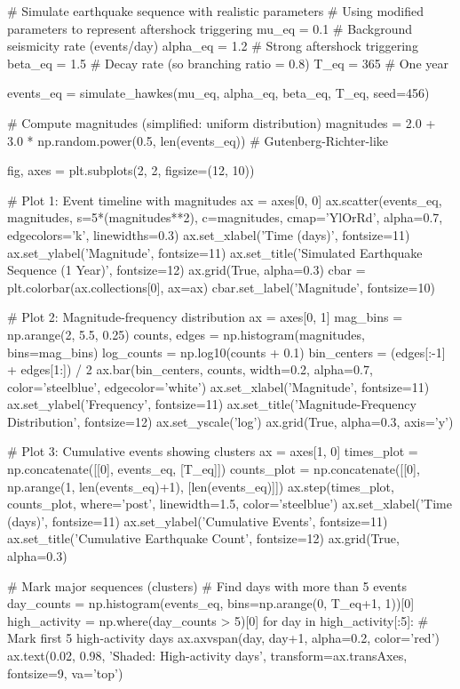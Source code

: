 \documentclass[a4paper, 11pt]{article}
\begin{document}
\begin{pycode}
# Simulate earthquake sequence with realistic parameters
# Using modified parameters to represent aftershock triggering
mu_eq = 0.1      # Background seismicity rate (events/day)
alpha_eq = 1.2   # Strong aftershock triggering
beta_eq = 1.5    # Decay rate (so branching ratio = 0.8)
T_eq = 365       # One year

events_eq = simulate_hawkes(mu_eq, alpha_eq, beta_eq, T_eq, seed=456)

# Compute magnitudes (simplified: uniform distribution)
magnitudes = 2.0 + 3.0 * np.random.power(0.5, len(events_eq))  # Gutenberg-Richter-like

fig, axes = plt.subplots(2, 2, figsize=(12, 10))

# Plot 1: Event timeline with magnitudes
ax = axes[0, 0]
ax.scatter(events_eq, magnitudes, s=5*(magnitudes**2), c=magnitudes,
           cmap='YlOrRd', alpha=0.7, edgecolors='k', linewidths=0.3)
ax.set_xlabel('Time (days)', fontsize=11)
ax.set_ylabel('Magnitude', fontsize=11)
ax.set_title('Simulated Earthquake Sequence (1 Year)', fontsize=12)
ax.grid(True, alpha=0.3)
cbar = plt.colorbar(ax.collections[0], ax=ax)
cbar.set_label('Magnitude', fontsize=10)

# Plot 2: Magnitude-frequency distribution
ax = axes[0, 1]
mag_bins = np.arange(2, 5.5, 0.25)
counts, edges = np.histogram(magnitudes, bins=mag_bins)
log_counts = np.log10(counts + 0.1)
bin_centers = (edges[:-1] + edges[1:]) / 2
ax.bar(bin_centers, counts, width=0.2, alpha=0.7, color='steelblue', edgecolor='white')
ax.set_xlabel('Magnitude', fontsize=11)
ax.set_ylabel('Frequency', fontsize=11)
ax.set_title('Magnitude-Frequency Distribution', fontsize=12)
ax.set_yscale('log')
ax.grid(True, alpha=0.3, axis='y')

# Plot 3: Cumulative events showing clusters
ax = axes[1, 0]
times_plot = np.concatenate([[0], events_eq, [T_eq]])
counts_plot = np.concatenate([[0], np.arange(1, len(events_eq)+1), [len(events_eq)]])
ax.step(times_plot, counts_plot, where='post', linewidth=1.5, color='steelblue')
ax.set_xlabel('Time (days)', fontsize=11)
ax.set_ylabel('Cumulative Events', fontsize=11)
ax.set_title('Cumulative Earthquake Count', fontsize=12)
ax.grid(True, alpha=0.3)

# Mark major sequences (clusters)
# Find days with more than 5 events
day_counts = np.histogram(events_eq, bins=np.arange(0, T_eq+1, 1))[0]
high_activity = np.where(day_counts > 5)[0]
for day in high_activity[:5]:  # Mark first 5 high-activity days
    ax.axvspan(day, day+1, alpha=0.2, color='red')
ax.text(0.02, 0.98, 'Shaded: High-activity days', transform=ax.transAxes,
        fontsize=9, va='top')


\end{pycode}
\end{document}
